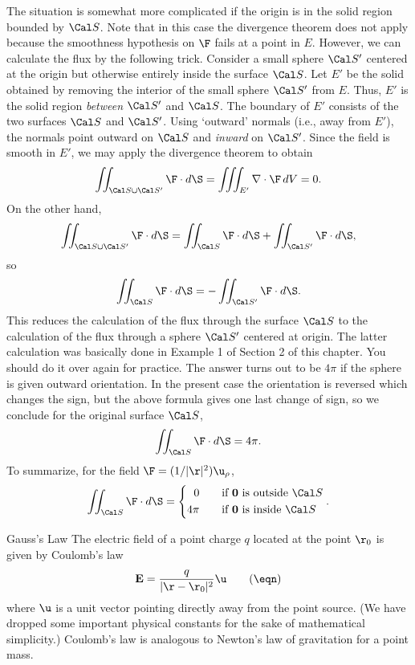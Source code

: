 \medskip
\centerline{}
\medskip
The situation is somewhat more complicated if the origin is
in the solid region bounded by $\Cal S$.  Note that in this
case the divergence theorem does not apply because the
smoothness hypothesis on $\F$ fails at a point in $E$.
However, we can calculate the flux by the following trick.
Consider a small sphere $\Cal S'$
 centered at the origin but otherwise
entirely inside the surface $\Cal S$.  Let $E'$ be the
solid obtained by removing the interior of the small sphere
$\Cal S'$ from $E$.  Thus, $E'$ is the solid region
{\it between\/} $\Cal S'$ and $\Cal S$.  The boundary of $E'$ consists
of the two surfaces $\Cal S$ and $\Cal S'$.  Using `outward'
normals (i.e., away from $E'$), the normals point outward
on $\Cal S$ and {\it inward\/} on $\Cal S'$.  Since the
field is smooth in $E'$, we may apply the divergence theorem
to obtain
$$
\iint_{\Cal S\cup \Cal S'} \F\cdot d\S
 = \iiint_{E'} \nabla\cdot\F\,dV = 0.
$$
On the other hand,
$$\iint_{\Cal S\cup \Cal S'} \F\cdot d\S =
 \iint_{\Cal S} \F\cdot d\S +
\iint_{\Cal S'} \F\cdot d\S,
$$
so
$$
 \iint_{\Cal S} \F\cdot d\S =
 -\iint_{\Cal S'} \F\cdot d\S.
$$
This reduces the calculation of the flux through the surface
$\Cal S$ to the calculation of the flux through a sphere $\Cal S'$
centered at origin.  The latter calculation was basically done
in Example 1 of Section 2 of this chapter.   You should do it
over again for practice.   The answer turns out to be $4\pi$
if the sphere is given outward orientation.  In the present
case the orientation is reversed which changes the sign, but
the above formula gives one last change of sign, so we
conclude for the original surface $\Cal S$,
$$
\iint_{\Cal S} \F\cdot d\S = 4\pi.
$$ 
 To summarize, for the field $\F = (1/|\r|^2)\u_\rho$, 
$$
\iint_{\Cal S}\F\cdot d\S = \left\{\aligned
             0\qquad&\text{if $\bold 0$ is outside $\Cal S$}\\
             4\pi\qquad&\text{if $\bold 0$ is inside $\Cal S$}
\endaligned \right. .
$$

\subhead Gauss's Law \endsubhead
The electric field of a point charge $q$ located at the point
$\r_0$ is given by Coulomb's law
\nexteqn
\xdef\Coul{\eqn}
$$
  \bold E = \frac q{|\r - \r_0|^2} \u\tag\eqn
$$
where $\u$ is a unit vector pointing directly away from the point
source.   (We have dropped some important physical
constants for the sake of mathematical simplicity.)   
Coulomb's law is analogous to Newton's law of gravitation for
a point mass.   


